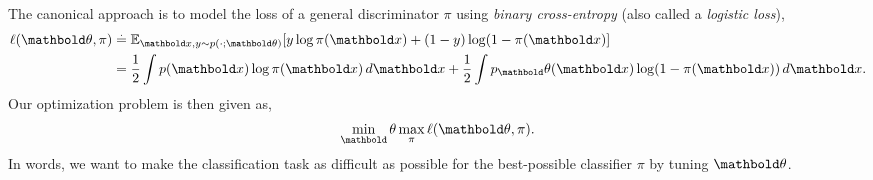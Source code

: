 \documentclass{tufte-handout}
\begin{document}
The canonical approach is to model the loss of a general discriminator $\pi$ using \emph{binary cross-entropy} (also called a \emph{logistic loss}), \begin{align}
    \ell(\vtheta, \pi) &\defeq \E[\vx, y \sim p(\cdot; \vtheta)]{y \log \pi(\vx) + (1-y) \log (1 - \pi(\vx)} \\
    &= \frac{1}{2} \int p(\vx) \log \pi(\vx) \,d\vx + \frac{1}{2} \int p_\vtheta(\vx) \log(1 - \pi(\vx)) \,d\vx.
\end{align} Our optimization problem is then given as, \begin{align}
    \min_\vtheta \max_\pi \ell(\vtheta, \pi).
\end{align} In words, we want to make the classification task as difficult as possible for the best-possible classifier $\pi$ by tuning $\vtheta$.
\end{document}
